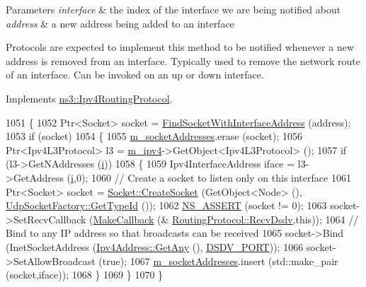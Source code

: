 \begin{DoxyParams}{Parameters}
{\em interface} & the index of the interface we are being notified about \\
\hline
{\em address} & a new address being added to an interface\\
\hline
\end{DoxyParams}
Protocols are expected to implement this method to be notified whenever a new address is removed from an interface. Typically used to remove the \textquotesingle{}network route\textquotesingle{} of an interface. Can be invoked on an up or down interface. 

Implements \hyperlink{classns3_1_1Ipv4RoutingProtocol_a0160e49e509d6699ec837e5485f65cd2}{ns3\+::\+Ipv4\+Routing\+Protocol}.


\begin{DoxyCode}
1051 \{
1052   Ptr<Socket> socket = \hyperlink{classns3_1_1dsdv_1_1RoutingProtocol_ab87d72bcdb89e0ff1034912db8868c01}{FindSocketWithInterfaceAddress} (address);
1053   \textcolor{keywordflow}{if} (socket)
1054     \{
1055       \hyperlink{classns3_1_1dsdv_1_1RoutingProtocol_a9f3be507604655079b145f063cf036fd}{m\_socketAddresses}.erase (socket);
1056       Ptr<Ipv4L3Protocol> l3 = \hyperlink{classns3_1_1dsdv_1_1RoutingProtocol_a955477c7f38e64762a264c24e3762af6}{m\_ipv4}->GetObject<Ipv4L3Protocol> ();
1057       \textcolor{keywordflow}{if} (l3->GetNAddresses (\hyperlink{bernuolliDistribution_8m_a6f6ccfcf58b31cb6412107d9d5281426}{i}))
1058         \{
1059           Ipv4InterfaceAddress iface = l3->GetAddress (\hyperlink{bernuolliDistribution_8m_a6f6ccfcf58b31cb6412107d9d5281426}{i},0);
1060           \textcolor{comment}{// Create a socket to listen only on this interface}
1061           Ptr<Socket> socket = \hyperlink{classns3_1_1Socket_ad448a62bb50ad3dbac59c879a885a8d2}{Socket::CreateSocket} (GetObject<Node> (),
      \hyperlink{classns3_1_1UdpSocketFactory_ad5b47e944de8861e3dc2b6de1ccbdf5b}{UdpSocketFactory::GetTypeId} ());
1062           \hyperlink{assert_8h_a6dccdb0de9b252f60088ce281c49d052}{NS\_ASSERT} (socket != 0);
1063           socket->SetRecvCallback (\hyperlink{group__makecallbackmemptr_ga9376283685aa99d204048d6a4b7610a4}{MakeCallback} (&
      \hyperlink{classns3_1_1dsdv_1_1RoutingProtocol_ad27475d64bfd478b57d73f3cc08d4c99}{RoutingProtocol::RecvDsdv},\textcolor{keyword}{this}));
1064           \textcolor{comment}{// Bind to any IP address so that broadcasts can be received}
1065           socket->Bind (InetSocketAddress (\hyperlink{classns3_1_1Ipv4Address_a7a39b330c8e701183a411d5779fca1a4}{Ipv4Address::GetAny} (), 
      \hyperlink{classns3_1_1dsdv_1_1RoutingProtocol_a14b063286a3c34efb9537f6456af3271}{DSDV\_PORT}));
1066           socket->SetAllowBroadcast (\textcolor{keyword}{true});
1067           \hyperlink{classns3_1_1dsdv_1_1RoutingProtocol_a9f3be507604655079b145f063cf036fd}{m\_socketAddresses}.insert (std::make\_pair (socket,iface));
1068         \}
1069     \}
1070 \}
\end{DoxyCode}


